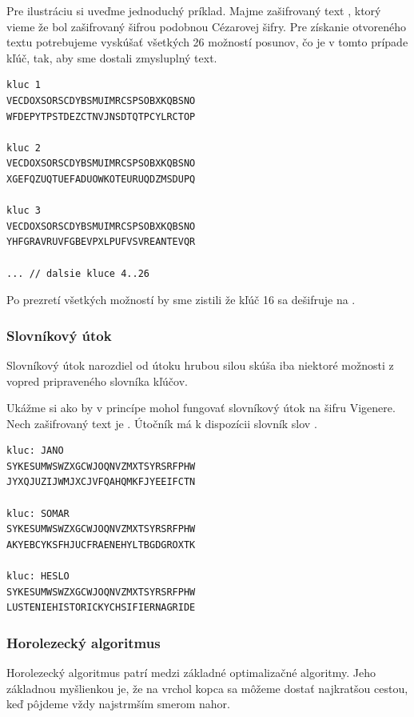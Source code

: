 Pre ilustráciu si uveďme jednoduchý príklad. Majme zašifrovaný text , ktorý vieme že bol zašifrovaný šifrou podobnou Cézarovej šifry.
Pre získanie otvoreného textu potrebujeme vyskúšať všetkých 26 možností posunov, čo je v tomto prípade kľúč, tak, aby sme dostali zmysluplný text.

\begin{lstlisting}
kluc 1
VECDOXSORSCDYBSMUIMRCSPSOBXKQBSNO
WFDEPYTPSTDEZCTNVJNSDTQTPCYLRCTOP

kluc 2
VECDOXSORSCDYBSMUIMRCSPSOBXKQBSNO
XGEFQZUQTUEFADUOWKOTEURUQDZMSDUPQ

kluc 3
VECDOXSORSCDYBSMUIMRCSPSOBXKQBSNO
YHFGRAVRUVFGBEVPXLPUFVSVREANTEVQR

... // dalsie kluce 4..26
\end{lstlisting}

Po prezretí všetkých možností by sme zistili že kľúč 16 sa dešifruje na .


\subsubsection{Slovníkový útok}
Slovníkový útok narozdiel od útoku hrubou silou skúša iba niektoré možnosti z vopred pripraveného slovníka kľúčov.

Ukážme si ako by v princípe mohol fungovať slovníkový útok na šifru Vigenere.
Nech zašifrovaný text je . Útočník má k dispozícii slovník slov .

\begin{lstlisting}
kluc: JANO
SYKESUMWSWZXGCWJOQNVZMXTSYRSRFPHW
JYXQJUZIJWMJXCJVFQAHQMKFJYEEIFCTN

kluc: SOMAR
SYKESUMWSWZXGCWJOQNVZMXTSYRSRFPHW
AKYEBCYKSFHJUCFRAENEHYLTBGDGROXTK

kluc: HESLO
SYKESUMWSWZXGCWJOQNVZMXTSYRSRFPHW
LUSTENIEHISTORICKYCHSIFIERNAGRIDE
\end{lstlisting}

\subsubsection{Horolezecký algoritmus}
Horolezecký algoritmus patrí medzi základné optimalizačné algoritmy.
Jeho základnou myšlienkou je, že na vrchol kopca sa môžeme dostať najkratšou cestou, keď pôjdeme vždy najstrmším smerom nahor.

